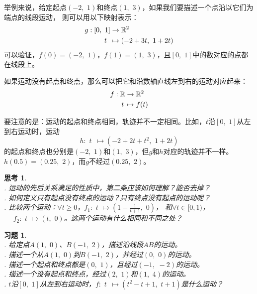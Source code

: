 \documentclass[12pt,UTF8]{ctexbook}
\newtheorem{sk}{思考}[section]
\newtheorem{xt}{习题}[section]
\begin{document}
举例来说，给定起点$(-2,\,\,1)$和终点$(1,\,\,3)$，如果我们要描述一个点沿以它们为端点的线段运动，
则可以用以下映射表示：
\begin{align}
    g: [0,\,\,1] &\rightarrow \mathbb{R}^2 \notag \\
         t \,\,\, &\mapsto (-2 + 3t,\,\, 1 + 2t) \notag
\end{align}
可以验证，$f(0) = (-2,\,\,1)$，$f(1) = (1,\,\,3)$，且$[0,\,\,1]$中的数对应的点都在线段上。

如果运动没有起点和终点，那么可以把它和沿数轴直线左到右的运动对应起来：
\begin{align}
    f: \mathbb{R} &\rightarrow \mathbb{R}^2 \notag \\
         t \, &\mapsto f(t) \notag
\end{align}

要注意的是：运动的起点和终点相同，轨迹并不一定相同。比如，$t$沿$[0,\,\,1]$从左到右运动时，运动
$$ h: \,\, t \,\,\, \mapsto (-2 + 2t + t^2,\,\, 1 + 2t) $$
的起点和终点也分别是$(-2,\,\,1)$和$(1,\,\,3)$，但$g$和$h$对应的轨迹并不一样。
$h(0.5) = (0.25, \,\,2)$，而$g$不经过$(0.25, \,\,2)$。

\begin{sk}
    \mbox{} \\
    . 运动的先后关系满足的性质中，第二条应该如何理解？能否去掉？\\
    . 如何定义只有起点没有终点的运动？只有终点没有起点的运动呢？\\
    . 比较两个运动：$\forall t \geqslant 0$，$f_1:\,\, t \,\, \mapsto (1 - \frac{1}{t+1}, \,\, 0)$，
    和$\forall t \in [0, 1)$，\\
    \indent $\quad \,\, f_2:\,\, t \,\, \mapsto (t, \,\,0)$。这两个运动有什么相同和不同之处？
\end{sk}

\begin{xt}
    \mbox{} \\
    . 给定点$A(1,\,\,0)$、$B(-1,\,\,2)$，描述沿线段$AB$的运动。\\
    . 描述一个从$A(1,\,\,0)$到$B(-1,\,\,2)$，并经过$(0,\,\,0)$的运动。\\
    . 描述一个起点和终点都是$(0, \,\, 1)$，且经过$(-1,\,\, -2)$的运动。\\
    . 描述一个没有起点和终点，经过$(2,\,\, 1)$和$(1,\,\, 4)$的运动。\\
    . $t$沿$[0,\,\,1]$从左到右运动时，$f: \,\, t \,\,\, \mapsto (t^2 - t + 1, \,\, t + 1)$是什么运动？
\end{xt}
\end{document}
